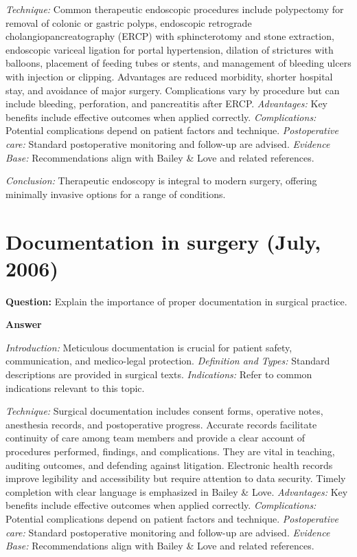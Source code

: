 \documentclass{article}
\begin{document}
\emph{Technique:} Common therapeutic endoscopic procedures include polypectomy for removal of colonic or gastric polyps, endoscopic retrograde cholangiopancreatography (ERCP) with sphincterotomy and stone extraction, endoscopic variceal ligation for portal hypertension, dilation of strictures with balloons, placement of feeding tubes or stents, and management of bleeding ulcers with injection or clipping. Advantages are reduced morbidity, shorter hospital stay, and avoidance of major surgery. Complications vary by procedure but can include bleeding, perforation, and pancreatitis after ERCP.
\emph{Advantages:} Key benefits include effective outcomes when applied correctly.
\emph{Complications:} Potential complications depend on patient factors and technique.
\emph{Postoperative care:} Standard postoperative monitoring and follow-up are advised.
\emph{Evidence Base:} Recommendations align with Bailey \& Love and related references.

\emph{Conclusion:} Therapeutic endoscopy is integral to modern surgery, offering minimally invasive options for a range of conditions.


\section{Documentation in surgery (July, 2006)}

\textbf{Question:} Explain the importance of proper documentation in surgical practice.

\textbf{Answer}

\emph{Introduction:} Meticulous documentation is crucial for patient safety, communication, and medico-legal protection.
\emph{Definition and Types:} Standard descriptions are provided in surgical texts.
\emph{Indications:} Refer to common indications relevant to this topic.

\emph{Technique:} Surgical documentation includes consent forms, operative notes, anesthesia records, and postoperative progress. Accurate records facilitate continuity of care among team members and provide a clear account of procedures performed, findings, and complications. They are vital in teaching, auditing outcomes, and defending against litigation. Electronic health records improve legibility and accessibility but require attention to data security. Timely completion with clear language is emphasized in Bailey \& Love.
\emph{Advantages:} Key benefits include effective outcomes when applied correctly.
\emph{Complications:} Potential complications depend on patient factors and technique.
\emph{Postoperative care:} Standard postoperative monitoring and follow-up are advised.
\emph{Evidence Base:} Recommendations align with Bailey \& Love and related references.
\end{document}
